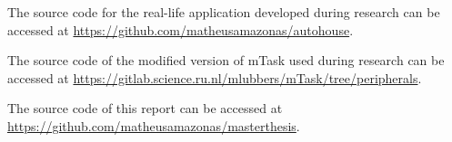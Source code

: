 The source code for the real-life application developed during research can be accessed at \url{https://github.com/matheusamazonas/autohouse}.

The source code of the modified version of mTask used during research can be accessed at \url{https://gitlab.science.ru.nl/mlubbers/mTask/tree/peripherals}.

The source code of this report can be accessed at \url{https://github.com/matheusamazonas/masterthesis}.


